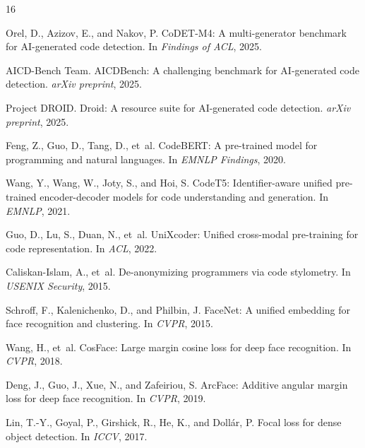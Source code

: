 \documentclass{article}
\begin{document}

\begin{thebibliography}{16}

Orel, D., Azizov, E., and Nakov, P.
\newblock CoDET-M4: A multi-generator benchmark for AI-generated code detection.
\newblock In \emph{Findings of ACL}, 2025.

AICD-Bench Team.
\newblock AICDBench: A challenging benchmark for AI-generated code detection.
\newblock \emph{arXiv preprint}, 2025.

Project DROID.
\newblock Droid: A resource suite for AI-generated code detection.
\newblock \emph{arXiv preprint}, 2025.

Feng, Z., Guo, D., Tang, D., et~al.
\newblock CodeBERT: A pre-trained model for programming and natural languages.
\newblock In \emph{EMNLP Findings}, 2020.

Wang, Y., Wang, W., Joty, S., and Hoi, S.
\newblock CodeT5: Identifier-aware unified pre-trained encoder-decoder models for code understanding and generation.
\newblock In \emph{EMNLP}, 2021.

Guo, D., Lu, S., Duan, N., et~al.
\newblock UniXcoder: Unified cross-modal pre-training for code representation.
\newblock In \emph{ACL}, 2022.

Caliskan-Islam, A., et~al.
\newblock De-anonymizing programmers via code stylometry.
\newblock In \emph{USENIX Security}, 2015.

Schroff, F., Kalenichenko, D., and Philbin, J.
\newblock FaceNet: A unified embedding for face recognition and clustering.
\newblock In \emph{CVPR}, 2015.

Wang, H., et~al.
\newblock CosFace: Large margin cosine loss for deep face recognition.
\newblock In \emph{CVPR}, 2018.

Deng, J., Guo, J., Xue, N., and Zafeiriou, S.
\newblock ArcFace: Additive angular margin loss for deep face recognition.
\newblock In \emph{CVPR}, 2019.

Lin, T.-Y., Goyal, P., Girshick, R., He, K., and Doll{\'a}r, P.
\newblock Focal loss for dense object detection.
\newblock In \emph{ICCV}, 2017.


\end{thebibliography}
\end{document}
